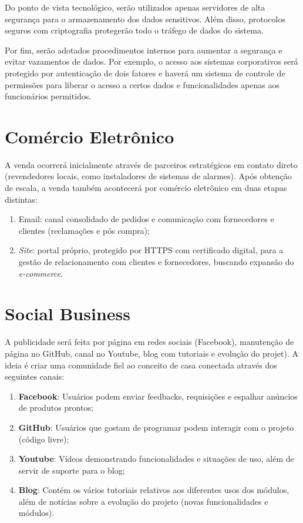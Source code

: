 Do ponto de vista tecnológico, serão utilizados apenas servidores de alta segurança para o armazenamento dos dados sensitivos. Além disso, protocolos seguros com criptografia protegerão todo o tráfego de dados do sistema.

Por fim, serão adotados procedimentos internos para aumentar a segurança e evitar vazamentos de dados. Por exemplo, o acesso aos sistemas corporativos será protegido por autenticação de dois fatores e haverá um sistema de controle de permissões para liberar o acesso a certos dados e funcionalidades apenas aos funcionários permitidos.

\section{Comércio Eletrônico}

A venda ocorrerá inicialmente através de parceiros estratégicos em contato direto (revendedores locais, como instaladores de sistemas de alarmes). Após obtenção de escala, a venda também acontecerá por comércio eletrônico em duas etapas distintas:

\begin{enumerate}
	\item Email: canal consolidado de pedidos e comunicação com fornecedores e clientes (reclamações e pós compra);
	\item \textit{Site}: portal próprio, protegido por HTTPS com certificado digital, para a gestão de relacionamento com clientes e fornecedores, buscando expansão do \textit{e-commerce}.
\end{enumerate}

\section{Social Business}

A publicidade será feita por página em redes sociais (Facebook), manutenção de página no GitHub, canal no Youtube, blog com tutoriais e evolução do projet). A ideia é criar uma comunidade fiel ao conceito de casa conectada através dos seguintes canais:

\begin{enumerate}
	\item \textbf{Facebook}: Usuários podem enviar feedbacks, requisições e espalhar anúncios de produtos prontos;
	\item \textbf{GitHub}: Usuários que gostam de programar podem interagir com o projeto (código livre);
	\item \textbf{Youtube}: Vídeos demonstrando funcionalidades e situações de uso, além de servir de suporte para o blog;
	\item \textbf{Blog}: Contém os vários tutoriais relativos aos diferentes usos dos módulos, além de notícias sobre a evolução do projeto (novas funcionalidades e módulos).
\end{enumerate}

